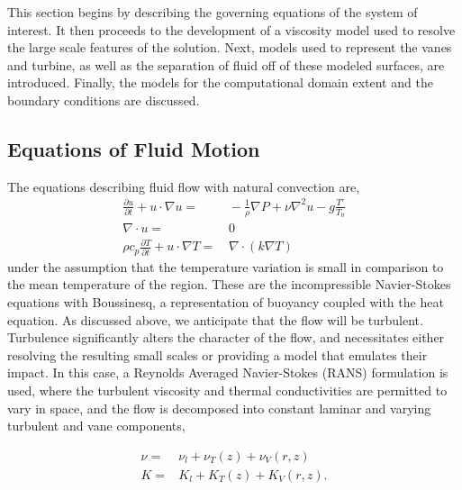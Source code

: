 This section begins by describing the governing equations of the system
of interest. It then proceeds to the development of a viscosity model
used to resolve the large scale features of the solution. Next, models
used to represent the vanes and turbine, as well as the separation of
fluid off of these modeled surfaces, are introduced.  Finally, the
models for the computational domain extent and the boundary conditions
are discussed. 


\subsection{Equations of Fluid Motion}
\label{sub_sec:ns_en}
%
%

The equations describing fluid flow with natural convection are,
\begin{align}
  \frac{\partial u}{\partial t} + u \cdot \nabla u =& \,
  -\frac{1}{\rho}\nabla P + \nu \nabla^2 u - g \frac{T'}{T_0}\\
  \nabla \cdot u =& \, 0 \\
  \rho c_p \frac{\partial T}{\partial t} + u \cdot \nabla T =& \, \nabla
 \cdot ( k \nabla T)
\end{align} 
under the assumption that the temperature variation is small in
comparison to the mean temperature of the region. These are the
incompressible Navier-Stokes equations with Boussinesq, a representation
of buoyancy coupled with the heat equation.  
%
%
%
As discussed above, we anticipate that the flow will be
turbulent. Turbulence significantly alters the character of the flow,
and necessitates either resolving the resulting small scales or
providing a model that emulates their impact. In this case, a
Reynolds Averaged Navier-Stokes (RANS) formulation is used, where the 
turbulent viscosity and thermal conductivities are permitted to vary in
space, and the flow is decomposed into constant laminar and varying
turbulent and vane components,  

\begin{eqnarray*}
 \nu =& \nu_{l} + \nu_{T}(z) + \nu_{V}(r,z) \\
 K =& K_{l} + K_{T}(z) + K_{V}(r,z).
\end{eqnarray*}

